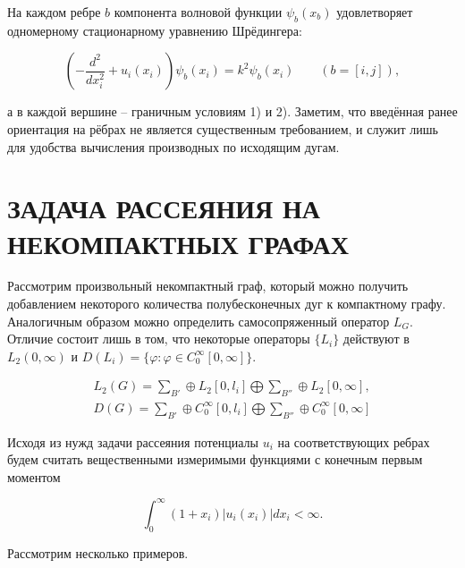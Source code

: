 \documentclass[a4 paper, 12 pt]{extarticle}
\begin{document}
  На каждом ребре $b$ компонента волновой функции $\psi_b(x_b)$
  удовлетворяет одномерному стационарному уравнению Шрёдингера:

  \begin{equation}\label{Shred1}
   \left(-\frac{d^2}{dx_i^2} +
    u_i(x_i)\right)\psi_b(x_{i})=k^2\psi_b(x_{i})\qquad(b=[i,j]),
  \end{equation}

  а в каждой вершине -- граничным условиям 1) и 2). Заметим, что
  введённая ранее ориентация на рёбрах не является существенным
  требованием, и служит лишь для удобства вычисления производных по
  исходящим дугам.
  
  
  \section{ЗАДАЧА РАССЕЯНИЯ НА НЕКОМПАКТНЫХ ГРАФАХ}
  
  Рассмотрим произвольный некомпактный граф, который можно получить добавлением некоторого количества полубесконечных дуг к компактному графу.
  Аналогичным образом можно определить самосопряженный оператор
  $L_G$. Отличие состоит лишь в том, что некоторые операторы
  $\{L_i\}$ действуют в $L_2(0, \infty)$ и
  $D(L_i)=\{\varphi:\varphi\in C_0^\infty[0,\infty]\}$.
  
  \begin{gather*}
  L_2(G)=\sum_{B'}\oplus L_2[0, l_i]\bigoplus\sum_{B''}\oplus
  L_2[0,\infty],
  \\
  D(G)=\sum_{B'}\oplus C_0^\infty[0,l_i]\bigoplus\sum_{B''}\oplus
  C_0^\infty[0,\infty]
  \end{gather*}
  
  Исходя из нужд задачи рассеяния потенциалы $u_i$ на
  соответствующих ребрах будем считать вещественными измеримыми
  функциями с конечным первым моментом
  
  \begin{equation}
  \int_0^\infty(1+x_i)|u_i(x_i)|dx_i<\infty.
  \end{equation}
 
  Рассмотрим несколько примеров.
  
\end{document}
